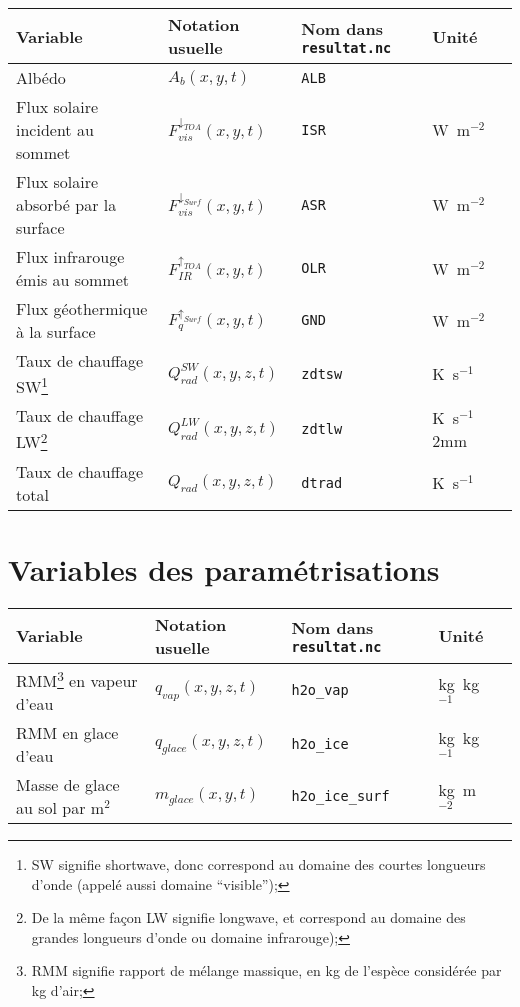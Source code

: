 \documentclass[a4paper,11pt]{article}
\begin{document}
\begin{savenotes}
\begin{table}[h!]
\centering
\begin{tabular}{lllll}
Variable & Notation usuelle & Nom dans \texttt{resultat.nc} & Unité
\\ \hline
Albédo & $A_b(x,y,t)$ & \texttt{ALB} & \\
Flux solaire incident au sommet & $F_{vis}^{\downarrow_{TOA}}(x,y,t)$ &
\texttt{ISR} & W~m$^{-2}$ \\
Flux solaire absorbé par la surface & $F_{vis}^{\downarrow_{Surf}}(x,y,t)$
& \texttt{ASR} & W~m$^{-2}$ \\
Flux infrarouge émis au sommet & $F_{IR}^{\uparrow_{TOA}}(x,y,t)$ &
\texttt{OLR} & W~m$^{-2}$ \\
Flux géothermique à la surface & $F_q^{\uparrow_{Surf}}(x,y,t)$ &
\texttt{GND} & W~m$^{-2}$ \vspace{2mm} \\
Taux de chauffage SW\footnote{SW signifie shortwave, donc correspond au domaine
des courtes longueurs d'onde (appelé aussi domaine ``visible'');} & $Q_
{rad}^{SW}(x,y,z,t)$ & \texttt{zdtsw} & K~s$^{-1}$ \vspace{2mm} \\
Taux de chauffage LW\footnote{De la même façon LW signifie longwave, et
correspond au domaine des grandes longueurs d'onde ou domaine infrarouge);}
& $Q_{rad}^{LW}(x,y,z,t)$ & \texttt{zdtlw} & K~s$^{-1}$ \vspace
{2mm} \\
Taux de chauffage total & $Q_{rad}(x,y,z,t)$ & \texttt{dtrad} &
K~s$^{-1}$ \vspace{2mm} \\
\end{tabular}
\end{table}
\end{savenotes}
\section{Variables des paramétrisations}


\begin{savenotes}
\begin{table}[h!]
\centering
\begin{tabular}{lllll}
Variable & Notation usuelle & Nom dans \texttt{resultat.nc} & Unité
\\ \hline
RMM\footnote{RMM signifie rapport de mélange massique, en kg de l'espèce
considérée par kg d'air;} en vapeur d'eau & $q_{vap}(x,y,z,t)$ &
\texttt{h2o\_vap} & kg~kg$^{-1}$ \\
RMM en glace d'eau & $q_{glace}(x,y,z,t)$ & \texttt{h2o\_ice} &
kg~kg$^{-1}$ \\
Masse de glace au sol par m$^2$ & $m_{glace}(x,y,t)$ & \texttt
{h2o\_ice\_surf} & kg~m$^{-2}$ \\
\end{tabular}
\end{table}
\end{savenotes}
\end{document}
